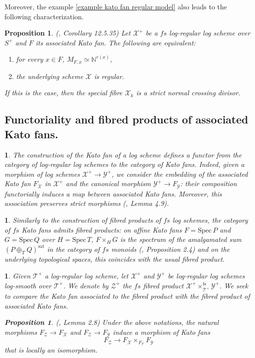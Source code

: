 \documentclass{amsart}%
\numberwithin{equation}{subsection}
\theoremstyle{plain2}
\newtheorem{prop}[equation]{Proposition}
\theoremstyle{definition2}
\theoremstyle{stepstyle}
\theoremstyle{point}
\theoremstyle{subpoint}
\newtheorem{subpoint}[equation]{}%
\newcommand{\spa}[1]{\begin{subpoint}#1\end{subpoint}}           %
\newcommand{\N}{\ensuremath{\mathbb{N}}}
\newcommand{\cX}{\ensuremath{\mathscr{X}}}
\newcommand{\cY}{\ensuremath{\mathscr{Y}}}
\newcommand{\cZ}{\ensuremath{\mathscr{Z}}}
\renewcommand{\cZ}{\ensuremath{\mathscr{Z}}}
\renewcommand{\cY}{\ensuremath{\mathscr{Y}}}
\newcommand{\Spec}{\ensuremath{\mathrm{Spec}\,}}
\begin{document}
Moreover, the example \ref{example kato fan regular model} also leads to the following characterization.

\begin{prop} \label{resolution log scheme kato fan} (\cite{GabberRamero}, Corollary 12.5.35)
Let $\cX^+$ be a $fs$ log-regular log scheme over $S^+$ and $F$ its associated Kato fan. The following are equivalent: \begin{enumerate}
\item for every $x \in F$, $M_{F,x} \simeq \N^{r(x)}$,
\item the underlying scheme $\cX$ is regular.
\end{enumerate}
If this is the case, then the special fibre $\cX_k$ is a strict normal crossing divisor.
\end{prop}

\subsection{Functoriality and fibred products of associated Kato fans.}
\spa{The construction of the Kato fan of a log scheme defines a functor from the category of log-regular log schemes to the category of Kato fans. Indeed, given a morphism of log schemes $\cX^+ \rightarrow \cY^+$, we consider the embedding of the associated Kato fan $F_{\cX}$ in $\cX^+$ and the canonical morphism $\cY^+ \rightarrow F_{\cY}$: their composition functorially induces a map between associated Kato fans. Moreover, this association preserves strict morphisms (\cite{Ulirsch2013}, Lemma 4.9).}
\spa{Similarly to the construction of fibred products of $fs$ log schemes, the category of $fs$ Kato fans admits fibred products: on affine Kato fans $F=\Spec P$ and $G=\Spec Q$ over $H=\Spec T$, $F\times_{H}G$ is the spectrum of the amalgamated sum $(P \oplus_T Q)^{\text{sat}}$ in the category of $fs$ monoids (\cite{Ulirsch2016}, Proposition 2.4) and on the underlying topological spaces, this coincides with the usual fibred product.}
\spa{Given $\mathscr{T}^+$ a log-regular log scheme, let $\cX^+$ and $\cY^+$ be log-regular log schemes log-smooth over $\mathscr{T}^+$. We denote by $\cZ^+$ the $fs$ fibred product $\cX^+\times^{\text{fs}}_{\mathscr{T}^+} \cY^+$. We seek to compare the Kato fan associated to the fibred product with the fibred product of associated Kato fans.
\begin{prop} \label{local isomo kato fan product}(\cite{Saito2004}, Lemma 2.8) Under the above notations, the natural morphisms $F_{\cZ}\to F_{\cX}$ and $F_{\cZ}\to F_{\cY}$ induce a morphism of Kato fans $$F_{\cZ} \rightarrow F_{\cX} \times_{F_{\mathscr{T}}} F_{\cY}$$ that is locally an isomorphism.
\end{prop}}
\end{document}
